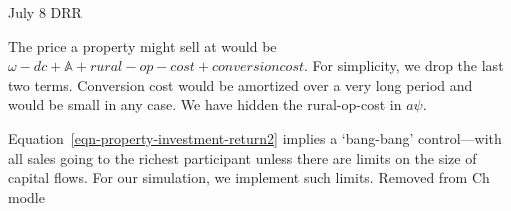 \documentclass[letterpaper,12pt,titlepage,oneside,final]{book}
\begin{document}
% 


%     



July 8 DRR

The price a property might sell at would be $\omega - {dc} + \mathbb{A} + rural-op-cost + conversion cost$. For simplicity, we drop the last two terms. Conversion cost would be amortized over a very long period and would be small in any case. We have hidden the rural-op-cost in $a\psi$.


Equation~\ref{eqn-property-investment-return2} implies a `bang-bang' control---with all sales going to the richest participant unless there are limits on the size of capital flows. For our simulation, we implement such limits.  Removed from Ch modle 
\end{document}
